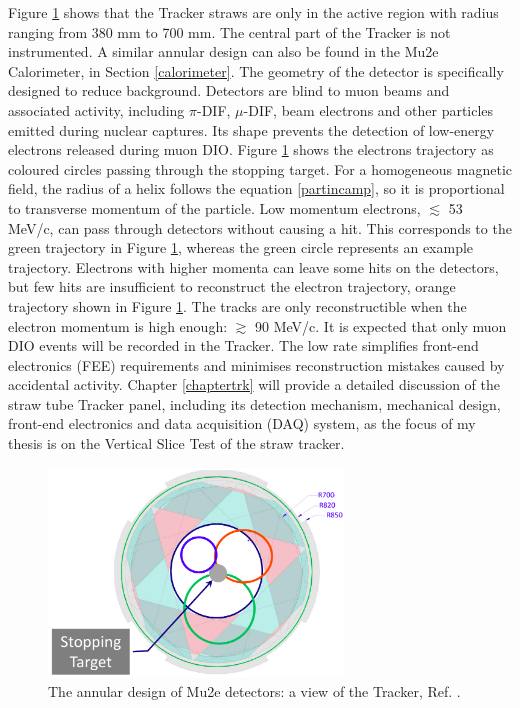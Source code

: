 Figure \ref{fig:sttrk} shows that the Tracker straws are only 
in the active region with radius ranging from 380 mm to 700 mm. 
The central part of the Tracker is not instrumented. A similar annular 
design can also be found in the Mu2e Calorimeter, in Section \ref{calorimeter}. 
The geometry of the detector is specifically designed to reduce background. 
Detectors are blind to muon beams and associated activity, including $\pi$-DIF, 
$\mu$-DIF, beam electrons and other particles emitted during nuclear captures. 
Its shape prevents the detection of low-energy electrons released during muon DIO. 
Figure \ref{fig:sttrk} shows the electrons trajectory as coloured circles passing 
through the stopping target. For a homogeneous magnetic field, the radius of a 
helix follows the equation \ref{partincamp}, so it is proportional to transverse 
momentum of the particle. Low momentum electrons, $\lesssim$ 53 MeV/c, can pass 
through detectors without causing a hit. This corresponds to the green trajectory 
in Figure \ref{fig:sttrk}, whereas the green circle represents an example 
trajectory. Electrons with higher momenta can leave some hits on the 
detectors, but few hits are insufficient to reconstruct the electron 
trajectory, orange trajectory shown in Figure \ref{fig:sttrk}. The tracks 
are only reconstructible when the electron momentum is high enough: $\gtrsim$ 
90 MeV/c. It is expected that only muon DIO events will be recorded in the 
Tracker. The low rate simplifies front-end electronics (FEE) requirements 
and minimises reconstruction mistakes caused by accidental activity. 
Chapter \ref{chaptertrk} will provide a detailed discussion of the straw 
tube Tracker panel, including its detection mechanism, mechanical design, 
front-end electronics and data acquisition (DAQ) system, as the focus of 
my thesis is on the Vertical Slice Test of the straw tracker.
\begin{figure}[!h]
\centering
\includegraphics[width =0.7\textwidth]{figures/png/Screenshot_20240306_214911.png}
\caption{The annular design of Mu2e detectors: a view of the Tracker, Ref. \cite{trk}.}
\label{fig:sttrk}
\end{figure}
